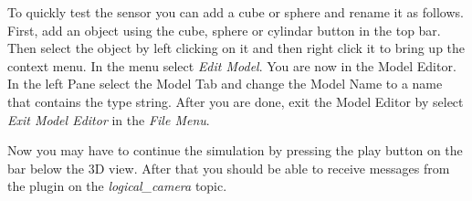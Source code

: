 To quickly test the sensor you can add a cube or sphere and rename it
as follows.  First, add an object using the cube, sphere or cylindar
button in the top bar.
Then select the object by left clicking on it and then right click it to
bring up the context menu. In the menu select \textit{Edit Model}.
You are now in the Model Editor.
In the left Pane select the Model Tab and change the Model Name to a name
that contains the type string. After you are done, exit the Model Editor
by select \textit{Exit Model Editor} in the \textit{File Menu}.

Now you may have to continue the simulation by pressing the play button
on the bar below the 3D view. After that you should be able to receive
messages from the plugin on the \textit{logical\_camera} topic.
